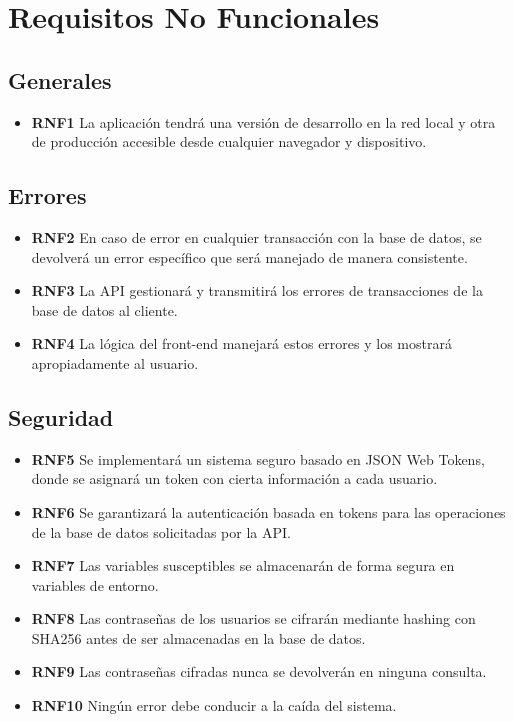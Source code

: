 \newpage

\section{Requisitos No Funcionales}

\subsection{Generales}
\begin{itemize}
    \item \textbf{RNF1} La aplicación tendrá una versión de desarrollo en la red local y otra de producción accesible desde cualquier navegador y dispositivo.
\end{itemize}

\subsection{Errores}
\begin{itemize}
    \item \textbf{RNF2} En caso de error en cualquier transacción con la base de datos, se devolverá un error específico que será manejado de manera consistente.
    \item \textbf{RNF3} La API gestionará y transmitirá los errores de transacciones de la base de datos al cliente.
    \item \textbf{RNF4} La lógica del front-end manejará estos errores y los mostrará apropiadamente al usuario.
\end{itemize}

\subsection{Seguridad}
\begin{itemize}
    \item \textbf{RNF5} Se implementará un sistema seguro basado en JSON Web Tokens, donde se asignará un token con cierta información a cada usuario.
    \item \textbf{RNF6} Se garantizará la autenticación basada en tokens para las operaciones de la base de datos solicitadas por la API.
    \item \textbf{RNF7} Las variables susceptibles se almacenarán de forma segura en variables de entorno.
    \item \textbf{RNF8} Las contraseñas de los usuarios se cifrarán mediante hashing con SHA256 antes de ser almacenadas en la base de datos.
    \item \textbf{RNF9} Las contraseñas cifradas nunca se devolverán en ninguna consulta.
    \item \textbf{RNF10} Ningún error debe conducir a la caída del sistema.
\end{itemize}

